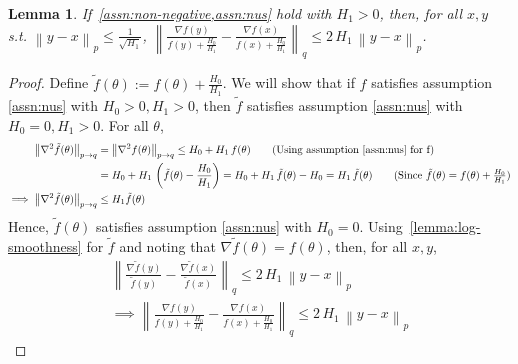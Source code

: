 \documentclass{article}
\newtheorem{lemma}{Lemma}
\newcommand{\norm}[1]{\left\|#1 \right\|}
\begin{document}
\begin{lemma}
If~\cref{assn:non-negative,assn:nus} hold with $H_1 > 0$, then, for all $x, y$ s.t. $\norm{y - x}_p \leq \frac{1}{\sqrt{H_1}}$, $\norm{\frac{\nabla f(y)}{f(y) + \frac{H_0}{H_1}} - \frac{\nabla f(x)}{f(x) + \frac{H_0}{H_1}}}_q \leq 2 \, H_1 \, \norm{y - x}_p$.     
\label{lemma:log-smoothness-gen}
\end{lemma}
\begin{proof}
Define $\tilde{f}(\theta):= f(\theta) + \frac{H_0}{H_1}$. We will show that if $f$ satisfies assumption \ref{assn:nus} with $H_0 > 0, H_1 > 0$, then $\tilde{f}$ satisfies assumption \ref{assn:nus} with $H_0 = 0, H_1 > 0$. For all $\theta$, 
\begin{align*}
\norm{\nabla^2 \tilde{f}(\theta)}_{p \to q} &= \norm{\nabla^2 f(\theta)}_{p \to q} \leq H_0 + H_1 \, f(\theta) \tag{Using assumption \ref{assn:nus} for f} \\
& = H_0 + H_1 \, \left( \tilde{f}(\theta) - \frac{H_0}{H_1} \right) = H_0 + H_1 \, \tilde{f}(\theta) - H_0 = H_1 \, \tilde{f}(\theta) \tag{Since $\tilde{f}(\theta) = f(\theta) + \frac{H_0}{H_1}$} \\
\implies \norm{\nabla^2 \tilde{f}(\theta)}_{p \to q} & \leq H_1 \tilde{f}(\theta)
\end{align*}
Hence, $\tilde{f}(\theta)$ satisfies assumption \ref{assn:nus} with $H_0 = 0$. Using~\cref{lemma:log-smoothness} for $\tilde{f}$ and noting that $\nabla \tilde{f}(\theta) = f(\theta)$, then, for all $x, y$,      
\begin{align*}
\norm{\frac{\nabla \tilde{f}(y)}{\tilde{f}(y)} - \frac{\nabla \tilde{f}(x)}{\tilde{f}(x)}}_q \leq 2 \, H_1 \, \norm{y - x}_p  \\
\implies \norm{\frac{\nabla f(y)}{f(y) + \frac{H_0}{H_1}} - \frac{\nabla f(x)}{f(x) + \frac{H_0}{H_1}}}_q \leq 2 \, H_1 \, \norm{y - x}_p
\end{align*}
\end{proof}
\end{document}
